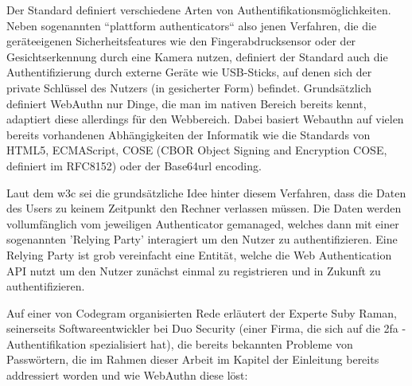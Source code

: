 Der Standard definiert verschiedene Arten von Authentifikationsmöglichkeiten. Neben sogenannten ``plattform authenticators`` \cite{A10} also jenen Verfahren, die die geräteeigenen Sicherheitsfeatures wie den Fingerabdrucksensor oder der Gesichtserkennung durch eine Kamera nutzen, definiert der Standard auch die Authentifizierung durch externe Geräte wie USB-Sticks, auf denen sich der private Schlüssel des Nutzers (in gesicherter Form) befindet. Grundsätzlich definiert WebAuthn nur Dinge, die man im nativen Bereich bereits kennt, adaptiert diese allerdings für den Webbereich. Dabei basiert Webauthn auf vielen bereits vorhandenen Abhängigkeiten der Informatik wie die Standards von HTML5, ECMAScript, COSE (CBOR Object Signing and Encryption COSE, definiert im RFC8152) oder der Base64url encoding.

Laut dem \ac{w3c} sei die grundsätzliche Idee hinter diesem Verfahren, dass die Daten des Users zu keinem Zeitpunkt den Rechner verlassen müssen. Die Daten werden vollumfänglich vom jeweiligen Authenticator gemanaged, welches dann mit einer sogenannten 'Relying Party' interagiert um den Nutzer zu authentifizieren. Eine Relying Party ist grob vereinfacht eine Entität, welche die Web Authentication API nutzt um den Nutzer zunächst einmal zu registrieren und in Zukunft zu authentifizieren. \cite{A10}

Auf einer von Codegram organisierten Rede erläutert der Experte Suby Raman, seinerseits Softwareentwickler bei Duo Security (einer Firma, die sich auf die \ac{2fa} - Authentifikation spezialisiert hat), die bereits bekannten Probleme von Passwörtern, die im Rahmen dieser Arbeit im Kapitel der Einleitung bereits addressiert worden und wie WebAuthn diese löst:
\newpage

